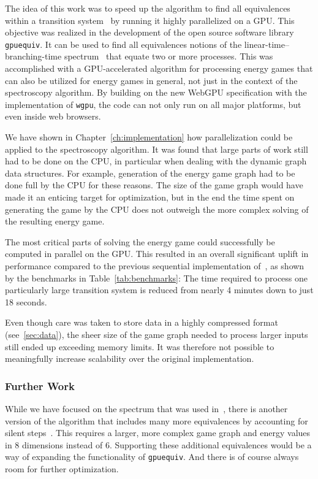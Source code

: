 The idea of this work was to speed up the algorithm to find all equivalences
within a transition system~\cite{bisping2023process} by running it highly
parallelized on a GPU\@.
This objective was realized in the development of the open source software
library \texttt{gpuequiv}.
It can be used to find all equivalences notions of the
linear-time--branching-time spectrum~\cite{glabbeek1990spectrum}
that equate two or more processes.
This was accomplished with a GPU-accelerated algorithm for processing energy
games that can also be utilized for energy games in general,
not just in the context of the spectroscopy algorithm.
By building on the new WebGPU specification with the implementation of
\texttt{wgpu},
the code can not only run on all major platforms,
but even inside web browsers.

We have shown in Chapter~\ref{ch:implementation} how parallelization could be
applied to the spectroscopy algorithm.
It was found that large parts of work still had to be done on the CPU,
in particular when dealing with the dynamic graph data structures.
For example, generation of the energy game graph had to be done full by the CPU
for these reasons.
The size of the game graph would have made it an enticing target for
optimization,
but in the end the time spent on generating the game by the CPU does not
outweigh the more complex solving of the resulting energy game.

The most critical parts of solving the energy game could successfully be
computed in parallel on the GPU\@.
This resulted in an overall significant uplift in performance compared to the
previous sequential implementation of~\cite{bisping2023process},
as shown by the benchmarks in Table~\ref{tab:benchmarks}:
The time required to process one particularly large transition system is
reduced from nearly 4 minutes down to just 18 seconds.

Even though care was taken to store data in a highly compressed format
(see~\ref{sec:data}),
the sheer size of the game graph needed to process larger inputs still
ended up exceeding memory limits.
It was therefore not possible to meaningfully increase scalability
over the original implementation.

\subsubsection{Further Work}

While we have focused on the spectrum that was used
in~\cite{bisping2023process},
there is another version of the algorithm that includes many more equivalences
by accounting for silent steps~\cite{bisping2023silent}.
This requires a larger,
more complex game graph and energy values in 8 dimensions instead of 6.
Supporting these additional equivalences would be a way of expanding the
functionality of \texttt{gpuequiv}.
And there is of course always room for further optimization.

